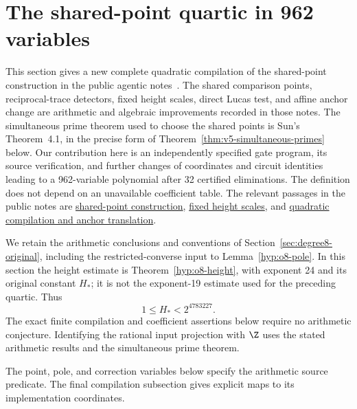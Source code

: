 \section{The shared-point quartic in 962 variables}
\label{sec:v6-962}

This section gives a new complete quadratic compilation of the shared-point
construction in the public agentic notes~\cite{agentic-improvements}.
The shared comparison points, reciprocal-trace detectors, fixed height
scales, direct Lucas test, and affine anchor change are arithmetic
and algebraic improvements recorded in those notes. The simultaneous prime theorem used to choose
the shared points is Sun's Theorem~4.1, in the precise form of
Theorem~\ref{thm:v5-simultaneous-primes} below. Our contribution here is an
independently specified gate program, its source verification, and
further changes of coordinates and circuit identities leading to a
962-variable polynomial after 32 certified eliminations. The
definition does not depend on an unavailable coefficient table.
The relevant passages in the public notes are
\href{https://github.com/JoseBrox/diophantine-z-q_improvements/blob/f4d1b5e6c23d4adeb3ae1f986ab0bf87884bdff6/paper/diophantine_optimization_20261106_v3.tex#L2354-L3044}{shared-point construction},
\href{https://github.com/JoseBrox/diophantine-z-q_improvements/blob/f4d1b5e6c23d4adeb3ae1f986ab0bf87884bdff6/paper/diophantine_optimization_20261106_v3.tex#L3352-L3405}{fixed height scales},
and
\href{https://github.com/JoseBrox/diophantine-z-q_improvements/blob/f4d1b5e6c23d4adeb3ae1f986ab0bf87884bdff6/paper/diophantine_optimization_20261106_v3.tex#L4135-L4758}{quadratic compilation and anchor translation}.

We retain the arithmetic conclusions and conventions of
Section~\ref{sec:degree8-original}, including the restricted-converse
input to Lemma~\ref{hyp:o8-pole}. In this section the height estimate is
Theorem~\ref{hyp:o8-height}, with exponent 24 and its original constant
$H_*$; it is not the exponent-19 estimate used for the preceding quartic.
Thus
\[
  1\le H_*<2^{4783227}.
\]
The exact finite compilation and coefficient assertions below require no
arithmetic conjecture. Identifying the rational input projection with
$\Z$ uses the stated arithmetic results and the simultaneous prime theorem.

The point, pole, and correction variables below specify the
arithmetic source predicate. The final compilation subsection
gives explicit maps to its implementation coordinates.

